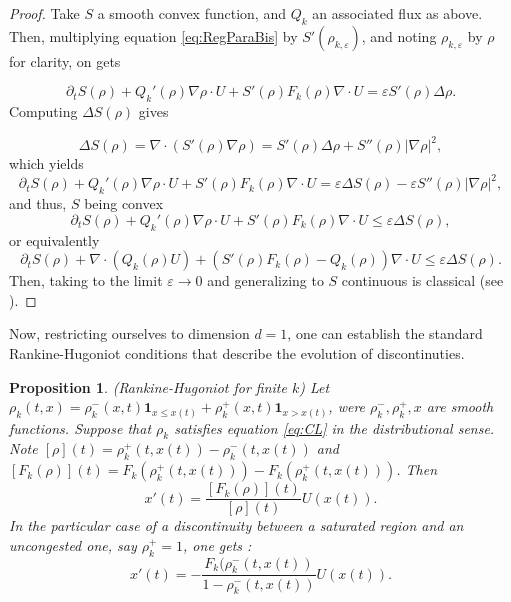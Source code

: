 \documentclass[11pt,twoside]{article}
\numberwithin{equation}{section}
\newcommand {\eps}  {\varepsilon}
\newcommand {\p}   {\partial}
\newtheorem{proposition}[theorem]{Proposition}
\begin{document}
\begin{proof}
    Take $S$ a smooth convex function, and $Q_k$ an associated flux as above. Then, multiplying equation \eqref{eq:RegParaBis} by $S'(\rho_{k,\eps})$, and noting $\rho_{k,\eps}$ by $\rho$ for clarity, on gets 

    \[
    \p_t S(\rho) + Q_k'(\rho) \nabla \rho \cdot U + S'(\rho)F_k(\rho) \nabla \cdot U = \varepsilon S'(\rho) \Delta \rho.
    \]
    Computing $\Delta S(\rho)$ gives 

    \[
    \Delta S(\rho) = \nabla \cdot (S'(\rho)\nabla \rho) = S'(\rho)\Delta \rho + S''(\rho) \vert \nabla \rho \vert ^2,
    \]
    which yields
    \[
    \p_t S(\rho) + Q_k'(\rho) \nabla \rho \cdot U + S'(\rho)F_k(\rho) \nabla \cdot U = \varepsilon \Delta S(\rho) - \varepsilon S''(\rho)\vert \nabla \rho \vert^2,
    \]
    and thus, $S$ being convex 
    \[
    \p_t S(\rho) + Q_k'(\rho) \nabla \rho \cdot U + S'(\rho)F_k(\rho) \nabla \cdot U \le \varepsilon \Delta S(\rho),
    \]
    or equivalently 
    \[
    \p_t S(\rho) + \nabla \cdot(Q_k(\rho)U) + (S'(\rho)F_k(\rho)-Q_k(\rho))\nabla \cdot U \le \eps \Delta S(\rho).
    \]
    Then, taking to the limit $\eps \to 0$ and generalizing to $S$ continuous is classical (see \cite{serre_systemes_1996} \cite{malek_weak_1996}).
\end{proof}

Now, restricting ourselves to dimension $d = 1$, one can establish the standard Rankine-Hugoniot conditions that describe the evolution of discontinuties.

\begin{proposition}(Rankine-Hugoniot for finite $k$)
\label{prop:RHk}
    Let $\rho_k(t,x) = \rho_k^-(x,t)\mathbf{1}_{x\le x(t)}+\rho_k^+(x,t) \mathbf{1}_{x>x(t)}$, were $\rho_k^-,\rho_k^+, x$ are smooth functions. Suppose that $\rho_k$ satisfies equation \eqref{eq:CL} in the distributional sense. Note $[\rho](t) = \rho_k^+(t,x(t))-\rho_k^-(t,x(t))$ and $[F_k(\rho)](t) = F_k(\rho_k^+(t,x(t)))-F_k(\rho_k^+(t,x(t)))$. Then
    \begin{equation}
        \label{eq:RH}
        x'(t)= \frac{[F_k(\rho)](t)}{[\rho](t)}U(x(t)).
    \end{equation} 
    In the particular case of a discontinuity between a saturated region and an uncongested one, say $\rho_k^+ = 1$, one gets :
    \begin{equation}
        \label{eq:RHSat}
        x'(t) = -\frac{F_k(\rho_k^-(t,x(t))}{1-\rho_k^-(t,x(t))}U(x(t)).
    \end{equation}
\end{proposition}
\end{document}
